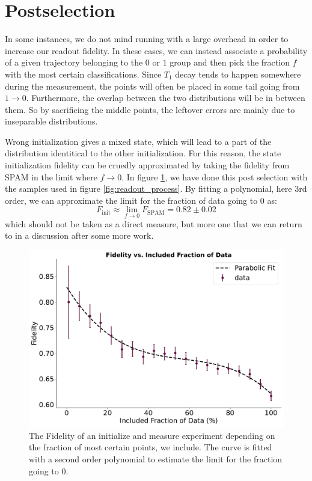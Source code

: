 \section{Postselection}
In some instances, we do not mind running with a large overhead in order to increase our readout fidelity. In these cases, we can instead associate a probability of a given trajectory belonging to the $0$ or $1$ group and then pick the fraction $f$ with the most certain classifications. Since $T_1$ decay tends to happen somewhere during the measurement, the points will often be placed in some tail going from $1 \to 0$. Furthermore, the overlap between the two distributions will be in between them. So by sacrificing the middle points, the leftover errors are mainly due to inseparable distributions. 

Wrong initialization gives a mixed state, which will lead to a part of the distribution identitical to the other initialization. For this reason, the state initialization fidelity can be cruedly approximated by taking the fidelity from SPAM in the limit where $f\to 0$. In figure \ref{fig:postselection_plot}, we have done this post selection with the samples used in figure \ref{fig:readout_process}. By fitting a polynomial, here 3rd order, we can approximate the limit for the fraction of data going to 0 as:
\begin{equation}
    F_{\text{init}} \approx \lim_{f \to 0} F_{\text{SPAM}} = 0.82 \pm 0.02
\end{equation}
which should not be taken as a direct measure, but more one that we can return to in a discussion after some more work.


\begin{figure}[t]
    \centering
    \includegraphics[]{Readout/Figs/fidelity_vs_included_fraction.pdf}
    \caption{The Fidelity of an initialize and measure experiment depending on the fraction of most certain points, we include. The curve is fitted with a second order polynomial to estimate the limit for the fraction going to $0$.}
    \label{fig:postselection_plot}
\end{figure}

